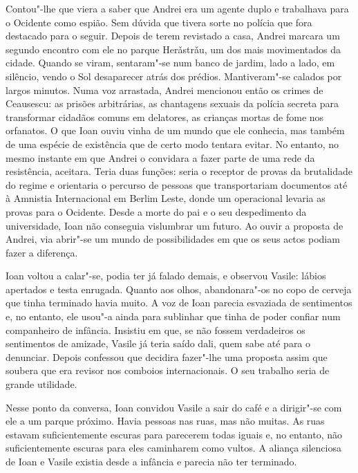 Contou"-lhe que viera a saber que Andrei era um agente duplo e trabalhava
para o Ocidente como espião. Sem dúvida que tivera sorte no polícia que
fora destacado para o seguir. Depois de terem revistado a casa, Andrei
marcara um segundo encontro com ele no parque Herǎstrǎu, um dos mais
movimentados da cidade. Quando se viram, sentaram"-se num banco de
jardim, lado a lado, em silêncio, vendo o Sol desaparecer atrás dos
prédios. Mantiveram"-se calados por largos minutos. Numa voz arrastada,
Andrei mencionou então os crimes de Ceausescu: as prisões arbitrárias, as chantagens sexuais da polícia secreta para transformar
cidadãos comuns em delatores, as crianças mortas de fome nos orfanatos.
O que Ioan ouviu vinha de um mundo que ele conhecia, mas também de uma
espécie de existência que de certo modo tentara evitar. No entanto, no
mesmo instante em que Andrei o convidara a fazer parte de uma rede da
resistência, aceitara. Teria duas funções: seria o receptor de provas
da brutalidade do regime e orientaria o percurso de pessoas que
transportariam documentos até à Amnistia Internacional em Berlim Leste,
donde um operacional levaria as provas para o Ocidente. Desde a morte do
pai e o seu despedimento da universidade, Ioan não conseguia
vislumbrar um futuro. Ao ouvir a proposta de Andrei, via abrir"-se um
mundo de possibilidades em que os seus actos podiam fazer a diferença.

Ioan voltou a calar"-se, podia ter já falado demais, e
observou Vasile: lábios apertados e testa enrugada. Quanto aos olhos,
abandonara"-os no copo de cerveja que tinha terminado havia muito. A voz
de Ioan parecia esvaziada de sentimentos e, no entanto, ele usou"-a ainda
para sublinhar que tinha de poder confiar num companheiro de infância.
Insistiu em que, se não fossem verdadeiros os sentimentos de amizade,
Vasile já teria saído dali, quem sabe até para o denunciar. Depois
confessou que decidira fazer"-lhe uma proposta assim que soubera que era
revisor nos comboios internacionais. O seu trabalho seria de grande
utilidade.

Nesse ponto da conversa, Ioan convidou Vasile a sair do café
e a dirigir"-se com ele a um parque próximo. Havia pessoas nas ruas, mas
não muitas. As ruas estavam suficientemente escuras para parecerem
todas iguais e, no entanto,
não suficientemente escuras para eles caminharem como vultos. A aliança
silenciosa de Ioan e Vasile existia desde a infância e parecia não ter
terminado.

